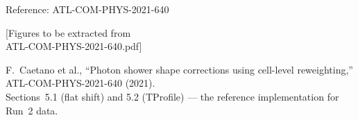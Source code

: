 \documentclass[aspectratio=169,10pt]{beamer}
\begin{document}
\begin{frame}[noframenumbering]{Reference: ATL-COM-PHYS-2021-640}

%

\centering
\vspace{1cm}
{\Large\color{gray} [Figures to be extracted from\\
ATL-COM-PHYS-2021-640.pdf]}

\vspace{1cm}
\small
F.~Caetano et al., ``Photon shower shape corrections using
cell-level reweighting,'' ATL-COM-PHYS-2021-640 (2021).\\[4pt]
Sections~5.1 (flat shift) and 5.2 (TProfile) — the reference
implementation for Run~2 data.
\end{frame}
\end{document}
